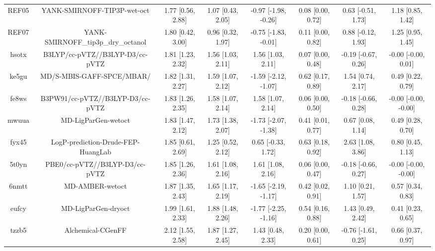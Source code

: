 \documentclass{article}
\begin{document}
\begin{center}
\begin{longtable}{|cccccccc|}
 REF05 &                        YANK-SMIRNOFF-TIP3P-wet-oct &  1.77 [0.56, 2.88] &  1.07 [0.43, 2.05] &  -0.97 [-1.98, -0.26] &  0.08 [0.00, 0.72] &   0.63 [-0.51, 1.73] &     1.18 [0.85, 1.42] \\
 REF07 &                 YANK-SMIRNOFF\_tip3p\_dry\_octanol &  1.80 [0.42, 3.00] &  0.96 [0.32, 1.97] &  -0.75 [-1.83, -0.01] &  0.11 [0.00, 0.82] &   0.88 [-0.12, 1.93] &     1.25 [0.95, 1.45] \\
 hsotx &                    B3LYP/cc-pVTZ//B3LYP-D3/cc-pVTZ &  1.81 [1.23, 2.32] &  1.56 [1.03, 2.11] &     1.56 [1.03, 2.11] &  0.07 [0.00, 0.48] &  -0.19 [-0.67, 0.26] &   -0.00 [-0.00, 0.01] \\
 ke5gu &                          MD/S-MBIS-GAFF-SPCE/MBAR/ &  1.82 [1.31, 2.27] &  1.59 [1.07, 2.12] &  -1.59 [-2.12, -1.07] &  0.62 [0.17, 0.89] &    1.54 [0.74, 2.17] &     0.49 [0.22, 0.79] \\
 fe8ws &                   B3PW91/cc-pVTZ//B3LYP-D3/cc-pVTZ &  1.83 [1.26, 2.35] &  1.58 [1.07, 2.14] &     1.58 [1.07, 2.14] &  0.06 [0.00, 0.50] &  -0.18 [-0.66, 0.28] &  -0.00 [-0.00, -0.00] \\
 mwuua &                                MD-LigParGen-wetoct &  1.83 [1.47, 2.12] &  1.73 [1.38, 2.07] &  -1.73 [-2.07, -1.38] &  0.41 [0.01, 0.77] &    0.67 [0.08, 1.14] &     0.49 [0.28, 0.70] \\
 fyx45 &                 LogP-prediction-Drude-FEP-HuangLab &  1.85 [0.61, 2.69] &  1.25 [0.52, 2.12] &    0.65 [-0.33, 1.72] &  0.63 [0.18, 0.92] &    2.63 [1.08, 3.86] &     0.80 [0.45, 1.13] \\
 5t0yn &                     PBE0/cc-pVTZ//B3LYP-D3/cc-pVTZ &  1.85 [1.26, 2.36] &  1.61 [1.08, 2.16] &     1.61 [1.08, 2.16] &  0.06 [0.00, 0.47] &  -0.18 [-0.66, 0.27] &  -0.00 [-0.00, -0.00] \\
 6nmtt &                                    MD-AMBER-wetoct &  1.87 [1.35, 2.43] &  1.65 [1.17, 2.19] &  -1.65 [-2.19, -1.17] &  0.42 [0.02, 0.91] &    1.10 [0.21, 1.57] &     0.57 [0.34, 0.83] \\
 eufcy &                                MD-LigParGen-dryoct &  1.99 [1.61, 2.33] &  1.88 [1.48, 2.26] &  -1.77 [-2.25, -1.16] &  0.54 [0.16, 0.88] &    1.43 [0.49, 2.42] &     0.41 [0.23, 0.65] \\
 tzzb5 &                                  Alchemical-CGenFF &  2.12 [1.55, 2.58] &  1.87 [1.27, 2.45] &     1.43 [0.48, 2.33] &  0.20 [0.00, 0.61] &  -0.76 [-1.61, 0.25] &     0.66 [0.37, 0.97] \\

\end{longtable}
\end{center}
\end{document}
